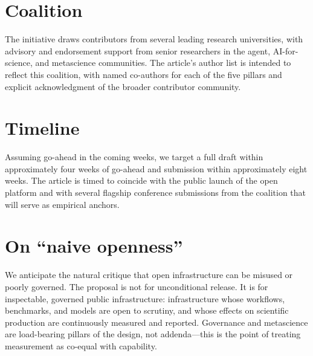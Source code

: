 \documentclass[11pt]{article}
\begin{document}
\section{Coalition}
The initiative draws contributors from several leading research universities, with advisory and endorsement support from senior researchers in the agent, AI-for-science, and metascience communities. The article's author list is intended to reflect this coalition, with named co-authors for each of the five pillars and explicit acknowledgment of the broader contributor community.

\section{Timeline}
Assuming go-ahead in the coming weeks, we target a full draft within approximately four weeks of go-ahead and submission within approximately eight weeks. The article is timed to coincide with the public launch of the open platform and with several flagship conference submissions from the coalition that will serve as empirical anchors.

\section{On ``naive openness''}
We anticipate the natural critique that open infrastructure can be misused or poorly governed. The proposal is not for unconditional release. It is for inspectable, governed public infrastructure: infrastructure whose workflows, benchmarks, and models are open to scrutiny, and whose effects on scientific production are continuously measured and reported. Governance and metascience are load-bearing pillars of the design, not addenda---this is the point of treating measurement as co-equal with capability.



\end{document}
